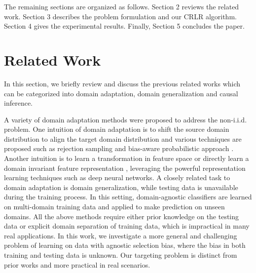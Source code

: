 \documentclass[sigconf]{acmart}
\begin{document}
The remaining sections are organized as follows.
Section 2 reviews the related work.
Section 3 describes the problem formulation and our CRLR algorithm.
Section 4 gives the experimental results.
Finally, Section 5 concludes the paper.

\section{Related Work}

In this section, we briefly review and discuss the previous related works which can be categorized into domain adaptation, domain generalization and causal inference.

A variety of domain adaptation methods were proposed to address the non-i.i.d. problem.
One intuition of domain adaptation is to shift the source domain distribution to align the target domain distribution and various techniques are proposed such as rejection sampling \cite{zadrozny2004learning} and bias-aware probabilistic approach \cite{liu2014robust}.
Another intuition is to learn a transformation in feature space or directly learn a domain invariant feature representation \cite{fernando2013unsupervised,long2016deep,ganin2015unsupervised,long2015learning,tzeng2015simultaneous,DBLP:conf/mm/SanginetoZRS14,DBLP:journals/pami/MaYSH14}, leveraging the powerful representation learning techniques such as deep neural networks.
A closely related task to domain adaptation is domain generalization, while testing data is unavailable during the training process.
In this setting, domain-agnostic classifiers \cite{Li2017Deeper,Ghifary2015Domain,Muandet2013Domain} are learned on multi-domain training data and applied to make prediction on unseen domains.
All the above methods require either prior knowledge on the testing data or explicit domain separation of training data, which is impractical in many real applications.
In this work, we investigate a more general and challenging problem of learning on data with agnostic selection bias, where the bias in both training and testing data is unknown.
Our targeting problem is distinct from prior works and more practical in real scenarios.
\end{document}
